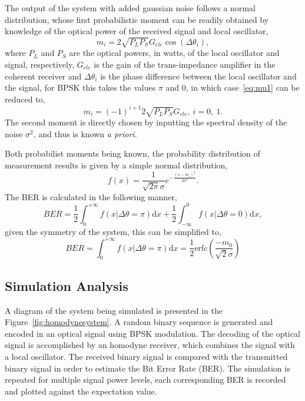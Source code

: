 The output of the system with added gaussian noise follows a normal distribution, whose first probabilistic moment can be readily obtained by knowledge of the optical power of the received signal and local oscillator,
\begin{equation}\label{eq:mu1}
m_i=2\sqrt{P_LP_S}G_{ele}\cos(\Delta\theta_i),
\end{equation}
where $P_L$ and $P_S$ are the optical powers, in watts, of the local oscillator and signal, respectively, $G_{ele}$ is the gain of the trans-impedance amplifier in the coherent receiver and $\Delta\theta_i$ is the phase difference between the local oscillator and the signal, for BPSK this takes the values $\pi$ and 0, in which case~\eqref{eq:mu1} can be reduced to,
\begin{equation}
m_i=(-1)^{i+1}2\sqrt{P_LP_S}G_{ele},~i=0,~1.
\end{equation}
The second moment is directly chosen by inputting the spectral density of the noise $\sigma^2$, and thus is known \textit{a priori}.
\par
Both probabilist moments being known, the probability distribution of measurement results is given by a simple normal distribution,
\begin{equation}
f(x)=\frac{1}{\sqrt{2\pi}\sigma}e^{-\frac{(x-m_i)^2}{2\sigma^2}}.
\end{equation}
The BER is calculated in the following manner,
\begin{equation}
BER=\frac{1}{2}\int_0^{+\infty}f(x|\Delta\theta=\pi)\text{d}x+\frac{1}{2}\int^0_{-\infty}f(x|\Delta\theta=0)\text{d}x,
\end{equation}
given the symmetry of the system, this can be simplified to,
\begin{equation}\label{eq:BERtheoretical}
BER=\int_0^{+\infty}f(x|\Delta\theta=\pi)\text{d}x=\frac{1}{2}\text{erfc}\left(\frac{-m_0}{\sqrt{2}\sigma}\right)
\end{equation}

\subsection{Simulation Analysis}

A diagram of the system being simulated is presented in the Figure~\ref{fig:homodynesystem}. A random binary sequence is generated and encoded in an optical signal using BPSK modulation. The decoding of the optical signal is accomplished by an homodyne receiver, which combines the signal with a local oscillator. The received binary signal is compared with the transmitted binary signal in order to estimate the Bit Error Rate (BER). The simulation is repeated for multiple signal power levels, each corresponding BER is recorded and plotted against the expectation value.

